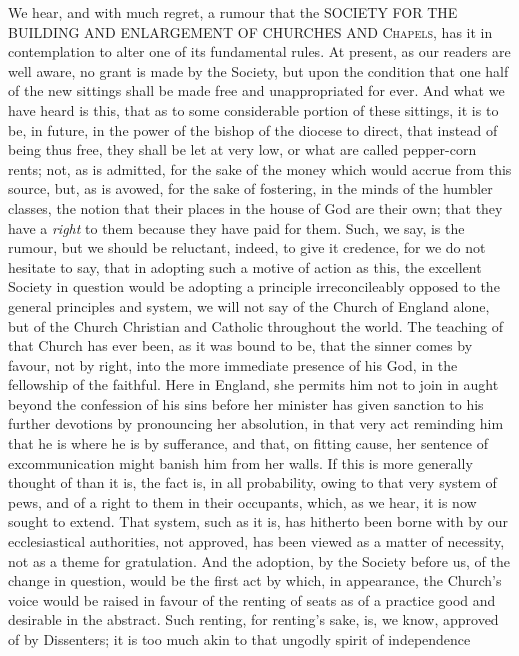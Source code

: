 We hear, and with much regret, a rumour that the SOCIETY
FOR THE BUILDING AND ENLARGEMENT
OF CHURCHES AND C\textsc{hapels},
has it in contemplation to alter one of its fundamental rules. At
present, as our readers are well aware, no grant is made by the Society,
but upon the condition that one half of the new sittings shall be made
free and unappropriated for ever. And what we have heard is this, that
as to some considerable portion of these sittings, it is to be, in
future, in the power of the bishop of the diocese to direct, that
instead of being thus free, they shall be let at very low, or what are
called pepper-corn rents; not, as is admitted, for the sake of the money
which would accrue from this source, but, as is avowed, for the sake of
fostering, in the minds of the humbler classes, the notion that their
places in the house of God are their own; that they have a \emph{right}
to them because they have paid for them. Such, we say, is the rumour,
but we should be reluctant, indeed, to give it credence, for we do not
hesitate to say, that in adopting such a motive of action as this, the
excellent Society in question would be adopting a principle
irreconcileably opposed to the general principles and system, we will
not say of the Church of England alone, but of the Church Christian and
Catholic throughout the world. The teaching of that Church has ever
been, as it was bound to be, that the sinner comes by favour, not by
right, into the more immediate presence of his God, in the fellowship of
the faithful. Here in England, she permits him not to join in aught
beyond the confession of his sins before her minister has given sanction
to his further devotions by pronouncing her absolution, in that very act
reminding him that he is where he is by sufferance, and that, on fitting
cause, her sentence of excommunication might banish him from her walls.
If this is more generally thought of than it is, the fact is, in all
probability, owing to that very system of pews, and of a right to them
in their occupants, which, as we hear, it is now sought to extend. That
system, such as it is, has hitherto been borne with by our
ecclesiastical authorities, not approved, has been viewed as a matter of
necessity, not as a theme for gratulation. And the adoption, by the
Society before us, of the change in question, would be the first act by
which, in appearance, the Church's voice would be raised in favour of
the renting of seats as of a practice good and desirable in the
abstract. Such renting, for renting's sake, is, we know, approved of by
Dissenters; it is too much akin to that ungodly spirit of independence
